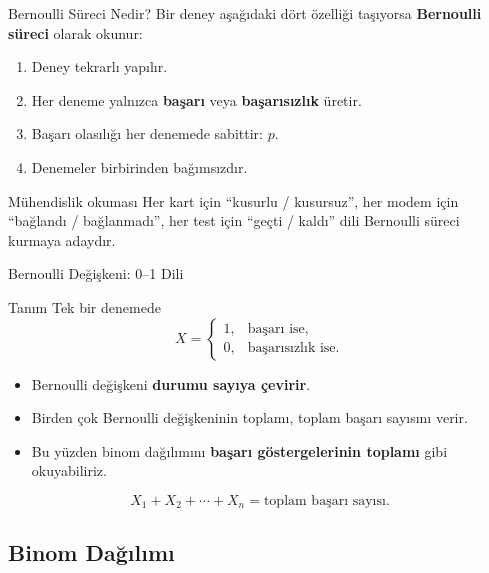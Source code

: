 \documentclass[light]{lutbeamer}
\begin{document}
\begin{frame}{Bernoulli Süreci Nedir?}
    \small
    Bir deney aşağıdaki dört özelliği taşıyorsa \textbf{Bernoulli süreci} olarak okunur:
    \begin{enumerate}
        \item Deney tekrarlı yapılır.
        \item Her deneme yalnızca \textbf{başarı} veya \textbf{başarısızlık} üretir.
        \item Başarı olasılığı her denemede sabittir: \(p\).
        \item Denemeler birbirinden bağımsızdır.
    \end{enumerate}

    \begin{exampleblock}{Mühendislik okuması}
        Her kart için ``kusurlu / kusursuz'', her modem için ``bağlandı / bağlanmadı'', her test için ``geçti / kaldı'' dili Bernoulli süreci kurmaya adaydır.
    \end{exampleblock}
\end{frame}

\begin{frame}{Bernoulli Değişkeni: 0--1 Dili}
    \small
    \begin{block}{Tanım}
        Tek bir denemede
        \[
        X=
        \begin{cases}
        1, & \text{başarı ise},\\
        0, & \text{başarısızlık ise}.
        \end{cases}
        \]
    \end{block}

    \begin{itemize}
        \item Bernoulli değişkeni \textbf{durumu sayıya çevirir}.
        \item Birden çok Bernoulli değişkeninin toplamı, toplam başarı sayısını verir.
        \item Bu yüzden binom dağılımını \textbf{başarı göstergelerinin toplamı} gibi okuyabiliriz.
    \end{itemize}

    \[
    X_1+X_2+\cdots+X_n = \text{toplam başarı sayısı}.
    \]
\end{frame}

\subsection{Binom Dağılımı}
\end{document}
